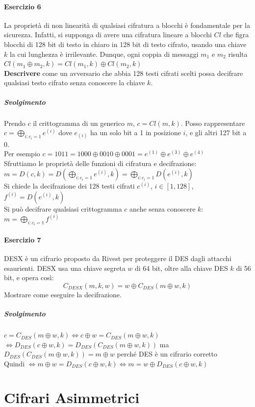 \documentclass[10pt]{book}
\begin{document}
\paragraph{Esercizio 6} La proprietà di non linearità di qualsiasi cifratura a blocchi è fondamentale per la sicurezza. Infatti, si supponga di avere una cifratura lineare a blocchi $Cl$ che figra blocchi di 128 bit di testo in chiaro in 128 bit di testo cifrato, usando una chiave $k$ la cui lunghezza è irrilevante. Dunque, ogni coppia di messaggi $m_1$ e $m_2$ risulta $Cl(m_1\oplus m_2, k) = Cl(m_1, k)\oplus Cl(m_2, k)$\\
\textbf{Descrivere} come un avversario che abbia 128 testi cifrati scelti possa decifrare qualsiasi testo cifrato senza conoscere la chiave $k$.
\subparagraph{Svolgimento} Prendo $c$ il crittogramma di un generico $m$, $c = Cl(m, k)$. Posso rappresentare $c = \bigoplus_{i:c_i = 1} e^{(i)}$ dove $e_{(i)}$ ha un solo bit a 1 in posizione $i$, e gli altri 127 bit a 0.\\
Per esempio $c = 1011 = 1000\oplus0010\oplus0001 = e^{(1)}\oplus e^{(3)}\oplus e^{(4)}$\\
Sfruttiamo le proprietà delle funzioni di cifratura e decifrazione: $m = D(c,k) = D(\bigoplus_{i:c_i = 1} e^{(i)}, k) = \bigoplus_{i:c_i = 1} D(e^{(i)}, k)$\\
Si chiede la decifrazione dei 128 testi cifrati $e^{(i)}$, $i\in[1,128]$, $f^{(i)} = D(e^{(i)}, k)$\\
Si può decifrare qualsiasi crittogramma $c$ anche senza conoscere $k$: $m = \bigoplus_{i:c_i = 1}f^{(i)}$
\paragraph{Esercizio 7} DESX è un cifrario proposto da Rivest per proteggere il DES dagli attacchi esaurienti. DESX usa una chiave segreta $w$ di 64 bit, oltre alla chiave DES $k$ di 56 bit, e opera così: $$C_{DESX}(m, k, w) = w\oplus C_{DES}(m\oplus w, k)$$Mostrare come eseguire la decifrazione.
\subparagraph{Svolgimento}
$c = C_{DES}(m\oplus w, k) \Leftrightarrow c\oplus w = C_{DES}(m\oplus w, k)$\\
$\Leftrightarrow D_{DES}(c\oplus w, k) = D_{DES}(C_{DES}(m\oplus w, k))$ ma $D_{DES}(C_{DES}(m\oplus w, k)) = m\oplus w$ perché DES è un cifrario corretto\\
Quindi $\Leftrightarrow m\oplus w = D_{DES}(c\oplus w, k) \Leftrightarrow m = w \oplus D_{DES}(c\oplus w, k)$
\section{Cifrari Asimmetrici}
\end{document}

